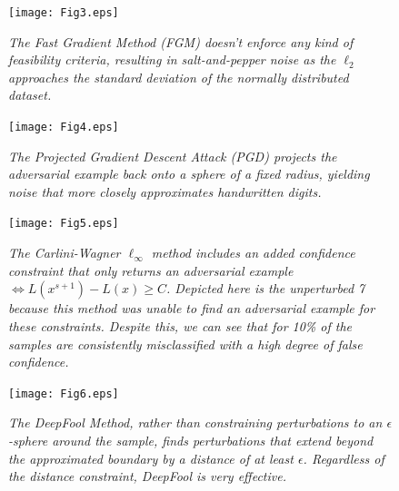 \documentclass[journal]{IEEEtran}
\newcommand{\cm}[1]{\textit{{\color{blue}#1}}}
\begin{document}
\label{samples}
\begin{figure}[]
          \texttt{[image: Fig3.eps]}
        \caption{ \cm{ The Fast Gradient Method (FGM) doesn't enforce any kind of feasibility criteria, resulting in salt-and-pepper noise as the $\ell_2$ approaches the standard deviation of the normally distributed dataset.}}
        \label{fig:FGM}
          \texttt{[image: Fig4.eps]}
        \caption{ \cm{The Projected Gradient Descent Attack (PGD) projects the adversarial example back onto a sphere of a fixed radius, yielding noise that more closely approximates handwritten digits.}}
        \label{fig:PGD}
          \texttt{[image: Fig5.eps]}
        \caption{ \cm{The Carlini-Wagner $\ell_{\infty}$ method includes an added confidence constraint that only returns an adversarial example $\iff L(x^{s+1}) - L(x) \geq C$. Depicted here is the unperturbed 7 because this method was unable to find an adversarial example for these constraints. Despite this, we can see that for 10\% of the samples are consistently misclassified with a high degree of false confidence. 
        }
        }
        \label{fig:CW}
          \texttt{[image: Fig6.eps]}
        \caption{\cm{The DeepFool Method, rather than constraining perturbations to an $\epsilon$-sphere around the sample, finds perturbations that extend beyond the approximated boundary by a distance of at least $\epsilon$. Regardless of the distance constraint, DeepFool is very effective.}}
        \label{fig:Deep}
 \end{figure}
\end{document}
